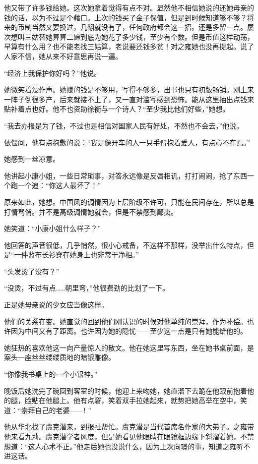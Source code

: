 \par 他又带了许多钱给她。这次她拿着觉得有点不对。显然他不相信她说的还她母亲的钱的话，以为不过是个藉口。上次的钱买了金子保值，但是到时候知道够不够？将来的币制当然又要换过，几翻就没有了，任何政府都会这一招。还是多留一点。屡次想叫三姑替她算算二婶到底为她花了多少钱，至少有个数。但是币值这样动荡，早算有什么用？也不能老找三姑算，老说要还钱多贫！对之雍她也没再提起。说了人家不信，她从来不好意思再说一遍。
\par “经济上我保护你好吗？”他说。
\par 她微笑着没作声。她赚的钱是不够用，写得不够多，出书也只有初版畅销。刚上来一阵子倒很多产，后来就接不上了，又一直对滥写感到恐怖。能从这里抽出点钱来贴补着点也好。他不也资助徐衡与一个诗人？“至少我比他们好些，”她想。
\par “我去办报是为了钱，不过也是相信对国家人民有好处，不然也不会去，”他说。
\par 依偎间，他有点抱歉的说：“我是像开车的人一只手臂抱着爱人，有点心不在焉。”
\par 她感到一丝凉意。
\par 他讲起小康小姐，一些日常琐事，对答永远像是反唇相讥，打打闹闹，抢了东西一个跑一个追：“你这人最坏了！”
\par 原来如此，她想。中国风的调情因为上层阶级不许可，只能在民间存在，所以总是打情骂俏。并不是高级调情她就会，但是不禁感到鄙夷。
\par 她笑道：“小康小姐什么样子？”
\par 他回答的声音很低，几乎悄然，很小心戒备，不这样不那样，没举出什么特点，但是“一件蓝布长衫穿在她身上也非常干净相。”
\par “头发烫了没有？”
\par “没烫，不过有点……朝里弯，”他很费劲的比划了一下。
\par 正是她母亲说的少女应当像这样。
\par 他们的关系在变。她直觉的回到他们刚认识的时候对他单纯的崇拜，作为补偿。也许因为中间又有了距离。也许因为她的隐忧——至少这一点是只有她能给他的。
\par 她狂热的喜欢他这一向产量惊人的散文。他在她这里写东西，坐在她书桌前面，是案头一座丝丝缕缕质地的暗银雕像。
\par “你像我书桌上的一个小银神。”
\par 晚饭后她洗完了碗回到客室的时候，他迎上来吻她，她直溜下去跪在他跟前抱着他的腿，脸贴在他腿上。他有点窘，笑着双手拉她起来，就势把她高举在空中，笑道：“崇拜自己的老婆——! ”
\par 他从华北找了虞克潜来，到报社帮忙。虞克潜是当代首席名作家的大弟子。之雍带他来看九莉。虞克潜学者风度，但是她看见他眼睛在眼镜框边缘下斜溜着她，不禁想道：“这人心术不正。”他走后她也没说什么，因为上次向璟的事，知道之雍听不进这话。
